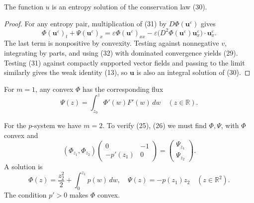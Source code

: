 \begin{theorem}
\label{thm:entropy-vanishing-viscosity}

The function $u$ is an entropy solution of the conservation law (30).
\end{theorem}

\begin{proof}
\sketch For any entropy pair, multiplication of (31) by $D\Phi(\mathbf u^\varepsilon)$ gives
\[
\Phi(\mathbf u^\varepsilon)_t+\Psi(\mathbf u^\varepsilon)_x
=\varepsilon\Phi(\mathbf u^\varepsilon)_{xx}
-\varepsilon\bigl(D^2\Phi(\mathbf u^\varepsilon)\mathbf u_x^\varepsilon\bigr)\cdot\mathbf u_x^\varepsilon.
\]
The last term is nonpositive by convexity. Testing against nonnegative $v$, integrating by parts, and using (32) with dominated convergence yields (29). Testing (31) against compactly supported vector fields and passing to the limit similarly gives the weak identity (13), so $\mathbf u$ is also an integral solution of (30).
\end{proof}

\begin{example}
\label{ex:scalar-entropy-flux-existence}

For $m=1$, any convex $\Phi$ has the corresponding flux
$$\Psi(z) = \int_{z_0}^z \Phi'(w)F'(w)\,dw \quad (z\in\mathbb{R}).$$
\end{example}

\begin{example}
\label{ex:p-system-entropy-pair}

For the $p$-system we have $m=2$. To verify (25), (26) we must find $\Phi,\Psi$, with $\Phi$ convex and
$$(\Phi_{z_1},\Phi_{z_2})\begin{pmatrix} 0 & -1 \\ -p'(z_1) & 0 \end{pmatrix} = \begin{pmatrix} \Psi_{z_1} \\ \Psi_{z_2} \end{pmatrix}.$$
A solution is
$$\Phi(z) = \frac{z_2^2}{2} + \int_0^{z_1} p(w)\,dw, \quad \Psi(z) = -p(z_1)z_2 \quad (z\in\mathbb{R}^2).$$
The condition $p'>0$ makes $\Phi$ convex.
\end{example}

